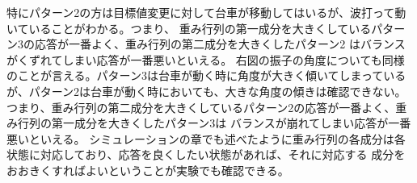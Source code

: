 	特にパターン2の方は目標値変更に対して台車が移動してはいるが、波打って動いていることがわかる。つまり、
	重み行列の第一成分を大きくしているパターン3の応答が一番よく、重み行列の第二成分を大きくしたパターン2
	はバランスがくずれてしまい応答が一番悪いといえる。
	右図の振子の角度についても同様のことが言える。パターン3は台車が動く時に角度が大きく傾いてしまっているが、パターン2は台車が動く時においても、大きな角度の傾きは確認できない。
	つまり、重み行列の第二成分を大きくしているパターン2の応答が一番よく、重み行列の第一成分を大きくしたパターン3は
	バランスが崩れてしまい応答が一番悪いといえる。
	シミュレーションの章でも述べたように重み行列の各成分は各状態に対応しており、応答を良くしたい状態があれば、それに対応する
	成分をおおきくすればよいということが実験でも確認できる。
	\par
